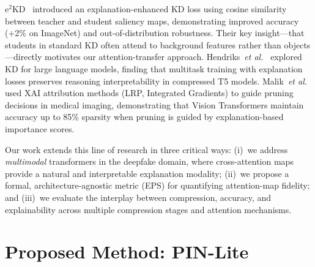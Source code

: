 \documentclass[lettersize,journal]{IEEEtran}
\begin{document}
e$^2$KD~\cite{parchami2024e2kd} introduced an explanation-enhanced KD loss using cosine similarity between teacher and student saliency maps, demonstrating improved accuracy (+2\% on ImageNet) and out-of-distribution robustness. Their key insight---that students in standard KD often attend to background features rather than objects---directly motivates our attention-transfer approach. Hendriks~\textit{et al.}~\cite{hendriks2025honey} explored KD for large language models, finding that multitask training with explanation losses preserves reasoning interpretability in compressed T5 models. Malik~\textit{et al.}~\cite{malik2025pruning} used XAI attribution methods (LRP, Integrated Gradients) to guide pruning decisions in medical imaging, demonstrating that Vision Transformers maintain accuracy up to 85\% sparsity when pruning is guided by explanation-based importance scores.

Our work extends this line of research in three critical ways: (i)~we address \emph{multimodal} transformers in the deepfake domain, where cross-attention maps provide a natural and interpretable explanation modality; (ii)~we propose a formal, architecture-agnostic metric (EPS) for quantifying attention-map fidelity; and (iii)~we evaluate the interplay between compression, accuracy, and explainability across multiple compression stages and attention mechanisms.


\section{Proposed Method: PIN-Lite}
\label{sec:method}
\end{document}
